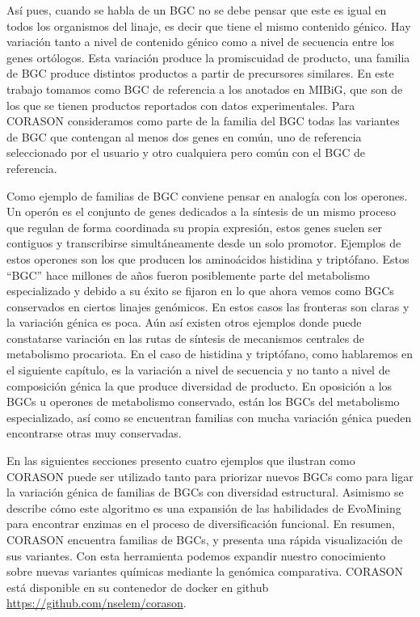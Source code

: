 \documentclass[12pt,twoside]{reedthesis}
\begin{document}
  Así pues, cuando se habla de un BGC no se debe pensar que este es igual
  en todos los organismos del linaje, es decir que tiene el mismo
  contenido génico. Hay variación tanto a nivel de contenido génico como a
  nivel de secuencia entre los genes ortólogos. Esta variación produce la
  promiscuidad de producto, una familia de BGC produce distintos productos
  a partir de precursores similares. En este trabajo tomamos como BGC de
  referencia a los anotados en MIBiG, que son de los que se tienen
  productos reportados con datos experimentales. Para CORASON consideramos
  como parte de la familia del BGC todas las variantes de BGC que
  contengan al menos dos genes en común, uno de referencia seleccionado
  por el usuario y otro cualquiera pero común con el BGC de referencia.
  
  Como ejemplo de familias de BGC conviene pensar en analogía con los
  operones. Un operón es el conjunto de genes dedicados a la síntesis de
  un mismo proceso que regulan de forma coordinada su propia expresión,
  estos genes suelen ser contiguos y transcribirse simultáneamente desde
  un solo promotor. Ejemplos de estos operones son los que producen los
  aminoácidos histidina y triptófano. Estos ``BGC'' hace millones de años
  fueron posiblemente parte del metabolismo especializado y debido a su
  éxito se fijaron en lo que ahora vemos como BGCs conservados en ciertos
  linajes genómicos. En estos casos las fronteras son claras y la
  variación génica es poca. Aún así existen otros ejemplos donde puede
  constatarse variación en las rutas de síntesis de mecanismos centrales
  de metabolismo procariota. En el caso de histidina y triptófano, como
  hablaremos en el siguiente capítulo, es la variación a nivel de
  secuencia y no tanto a nivel de composición génica la que produce
  diversidad de producto. En oposición a los BGCs u operones de
  metabolismo conservado, están los BGCs del metabolismo especializado,
  así como se encuentran familias con mucha variación génica pueden
  encontrarse otras muy conservadas.
  
  En las siguientes secciones presento cuatro ejemplos que ilustran como
  CORASON puede ser utilizado tanto para priorizar nuevos BGCs como para
  ligar la variación génica de familias de BGCs con diversidad
  estructural. Asimismo se describe cómo este algoritmo es una expansión
  de las habilidades de EvoMining para encontrar enzimas en el proceso de
  diversificación funcional. En resumen, CORASON encuentra familias de
  BGCs, y presenta una rápida visualización de sus variantes. Con esta
  herramienta podemos expandir nuestro conocimiento sobre nuevas variantes
  químicas mediante la genómica comparativa. CORASON está disponible en su
  contenedor de docker en github \url{https://github.com/nselem/corason}.
  
\end{document}
